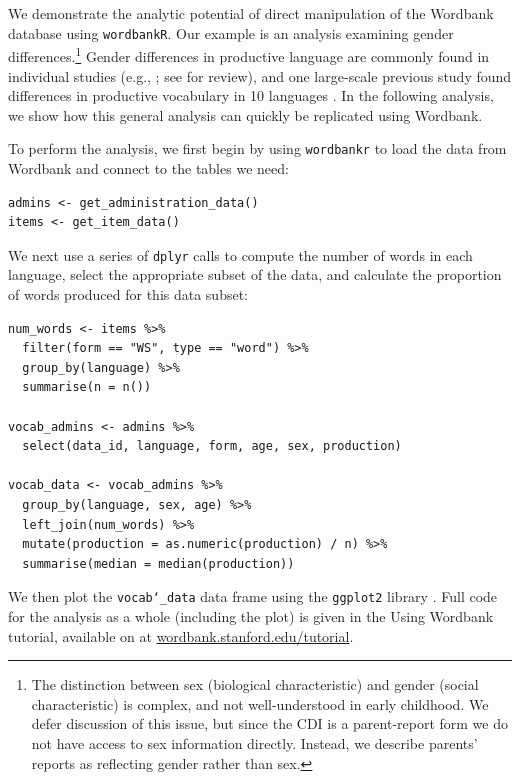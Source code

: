 \documentclass[man,noapacite]{apa}
\begin{document}
We demonstrate the analytic potential of direct manipulation of the Wordbank database using \texttt{wordbankR}. Our example is an analysis examining gender differences.\footnote{The distinction between sex (biological characteristic) and gender (social characteristic) is complex, and not well-understood in early childhood. We defer discussion of this issue, but since the CDI is a parent-report form we do not have access to sex information directly. Instead, we describe parents' reports as reflecting gender rather than sex.} Gender differences in productive language are commonly found in individual studies (e.g., ; see  for review), and one large-scale previous study found differences in productive vocabulary in 10 languages \cite{eriksson2012}. In the following analysis, we show how this general analysis can quickly be replicated using Wordbank.

To perform the analysis, we first begin by using \texttt{wordbankr} to load the data from Wordbank and connect to the tables we need:

\begin{lstlisting}
admins <- get_administration_data()
items <- get_item_data()
\end{lstlisting}

\noindent We next use a series of \texttt{dplyr} calls to compute the number of words in each language,  select the appropriate subset of the data, and calculate the proportion of words produced for this data subset:

\begin{lstlisting}
num_words <- items %>%
  filter(form == "WS", type == "word") %>%
  group_by(language) %>%
  summarise(n = n())

vocab_admins <- admins %>%
  select(data_id, language, form, age, sex, production)

vocab_data <- vocab_admins %>%
  group_by(language, sex, age) %>%
  left_join(num_words) %>%
  mutate(production = as.numeric(production) / n) %>%
  summarise(median = median(production))
\end{lstlisting}

\noindent We then plot the \texttt{vocab\char`_data} data frame using the \texttt{ggplot2} library \cite{wickham2009}. Full code for the analysis as a whole (including the plot) is given in the Using Wordbank tutorial, available on at \url{wordbank.stanford.edu/tutorial}.
\end{document}

